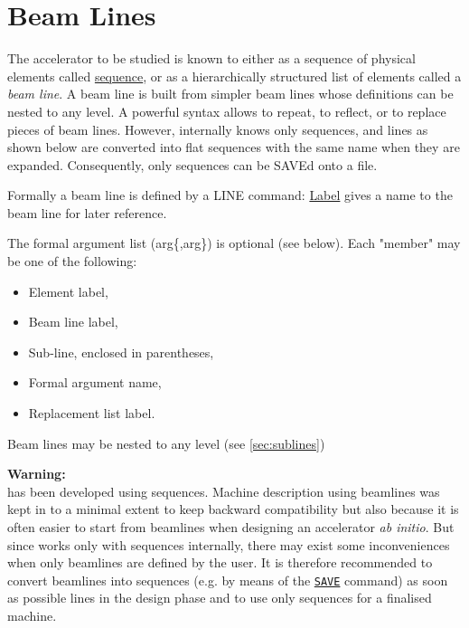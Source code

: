 

\chapter{Beam Lines}
\label{chap:beamlines}

The accelerator to be studied is known to \madx either as a sequence of
physical elements called \hyperref[chap:sequence]{sequence}, or as a
hierarchically structured list of elements called a \emph{beam line}. 
A beam line is built from simpler beam lines whose definitions can be
nested to any level. A powerful syntax allows to repeat, to reflect, or
to replace pieces of beam lines. However, internally \madx knows only
sequences, and lines as shown below are converted into flat sequences
with the same name when they are expanded. Consequently, only sequences
can be SAVEd onto a file.

Formally a beam line is defined by a LINE command: 
\hyperref[sec:label]{Label} gives a name to the beam line for later reference. 

The formal argument list (arg\{,arg\}) is optional (see below). Each
"member" may be one of the following:  
\begin{itemize}
\item  Element label, 
\item  Beam line label, 
\item  Sub-line, enclosed in parentheses, 
\item  Formal argument name, 
\item  Replacement list label. 
\end{itemize} 

Beam lines may be nested to any level (see \ref{sec:sublines})  


{\bf Warning:}\\
\madx has been developed using sequences. Machine description using
beamlines was kept in \madx to a minimal extent to keep backward 
compatibility but also because it is often easier to start from beamlines 
when designing an accelerator {\sl ab initio}.
But since \madx works only with sequences internally, there may exist
some inconveniences when only beamlines are defined by the user. It is
therefore recommended to convert beamlines into sequences (e.g. by means
of the \hyperref[sec:save]{\tt SAVE} command) as soon as possible lines in 
the design phase and to use only sequences for a finalised machine.     

